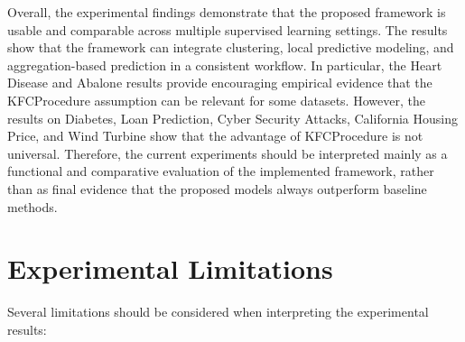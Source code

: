 Overall, the experimental findings demonstrate that the proposed framework is usable and comparable across multiple supervised learning settings. The results show that the framework can integrate clustering, local predictive modeling, and aggregation-based prediction in a consistent workflow. In particular, the Heart Disease and Abalone results provide encouraging empirical evidence that the KFCProcedure assumption can be relevant for some datasets. However, the results on Diabetes, Loan Prediction, Cyber Security Attacks, California Housing Price, and Wind Turbine show that the advantage of KFCProcedure is not universal. Therefore, the current experiments should be interpreted mainly as a functional and comparative evaluation of the implemented framework, rather than as final evidence that the proposed models always outperform baseline methods.

\section{Experimental Limitations}
\label{sec:experimental_limitations}

\hs Several limitations should be considered when interpreting the experimental results:

